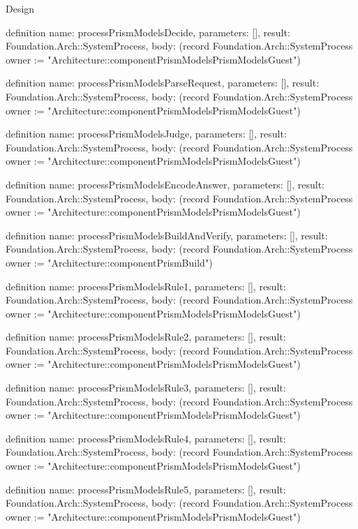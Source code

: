 \begin{lexlean}{Design}
\begin{semanticmodule}
definition{
  name: processPrismModelsDecide,
  parameters: [],
  result: Foundation.Arch::SystemProcess,
  body: (record Foundation.Arch::SystemProcess {owner := "Architecture::componentPrismModelsPrismModelsGuest"})
}

definition{
  name: processPrismModelsParseRequest,
  parameters: [],
  result: Foundation.Arch::SystemProcess,
  body: (record Foundation.Arch::SystemProcess {owner := "Architecture::componentPrismModelsPrismModelsGuest"})
}

definition{
  name: processPrismModelsJudge,
  parameters: [],
  result: Foundation.Arch::SystemProcess,
  body: (record Foundation.Arch::SystemProcess {owner := "Architecture::componentPrismModelsPrismModelsGuest"})
}

definition{
  name: processPrismModelsEncodeAnswer,
  parameters: [],
  result: Foundation.Arch::SystemProcess,
  body: (record Foundation.Arch::SystemProcess {owner := "Architecture::componentPrismModelsPrismModelsGuest"})
}

definition{
  name: processPrismModelsBuildAndVerify,
  parameters: [],
  result: Foundation.Arch::SystemProcess,
  body: (record Foundation.Arch::SystemProcess {owner := "Architecture::componentPrismBuild"})
}

definition{
  name: processPrismModelsRule1,
  parameters: [],
  result: Foundation.Arch::SystemProcess,
  body: (record Foundation.Arch::SystemProcess {owner := "Architecture::componentPrismModelsPrismModelsGuest"})
}

definition{
  name: processPrismModelsRule2,
  parameters: [],
  result: Foundation.Arch::SystemProcess,
  body: (record Foundation.Arch::SystemProcess {owner := "Architecture::componentPrismModelsPrismModelsGuest"})
}

definition{
  name: processPrismModelsRule3,
  parameters: [],
  result: Foundation.Arch::SystemProcess,
  body: (record Foundation.Arch::SystemProcess {owner := "Architecture::componentPrismModelsPrismModelsGuest"})
}

definition{
  name: processPrismModelsRule4,
  parameters: [],
  result: Foundation.Arch::SystemProcess,
  body: (record Foundation.Arch::SystemProcess {owner := "Architecture::componentPrismModelsPrismModelsGuest"})
}

definition{
  name: processPrismModelsRule5,
  parameters: [],
  result: Foundation.Arch::SystemProcess,
  body: (record Foundation.Arch::SystemProcess {owner := "Architecture::componentPrismModelsPrismModelsGuest"})
}


\end{semanticmodule}
\end{lexlean}
